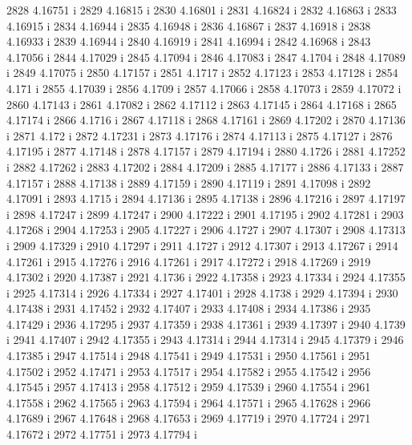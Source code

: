  2828  4.16751  i
 2829  4.16815  i
 2830  4.16801  i
 2831  4.16824  i
 2832  4.16863  i
 2833  4.16915  i
 2834  4.16944  i
 2835  4.16948  i
 2836  4.16867  i
 2837  4.16918  i
 2838  4.16933  i
 2839  4.16944  i
 2840  4.16919  i
 2841  4.16994  i
 2842  4.16968  i
 2843  4.17056  i
 2844  4.17029  i
 2845  4.17094  i
 2846  4.17083  i
 2847  4.1704  i
 2848  4.17089  i
 2849  4.17075  i
 2850  4.17157  i
 2851  4.1717  i
 2852  4.17123  i
 2853  4.17128  i
 2854  4.171  i
 2855  4.17039  i
 2856  4.1709  i
 2857  4.17066  i
 2858  4.17073  i
 2859  4.17072  i
 2860  4.17143  i
 2861  4.17082  i
 2862  4.17112  i
 2863  4.17145  i
 2864  4.17168  i
 2865  4.17174  i
 2866  4.1716  i
 2867  4.17118  i
 2868  4.17161  i
 2869  4.17202  i
 2870  4.17136  i
 2871  4.172  i
 2872  4.17231  i
 2873  4.17176  i
 2874  4.17113  i
 2875  4.17127  i
 2876  4.17195  i
 2877  4.17148  i
 2878  4.17157  i
 2879  4.17194  i
 2880  4.1726  i
 2881  4.17252  i
 2882  4.17262  i
 2883  4.17202  i
 2884  4.17209  i
 2885  4.17177  i
 2886  4.17133  i
 2887  4.17157  i
 2888  4.17138  i
 2889  4.17159  i
 2890  4.17119  i
 2891  4.17098  i
 2892  4.17091  i
 2893  4.1715  i
 2894  4.17136  i
 2895  4.17138  i
 2896  4.17216  i
 2897  4.17197  i
 2898  4.17247  i
 2899  4.17247  i
 2900  4.17222  i
 2901  4.17195  i
 2902  4.17281  i
 2903  4.17268  i
 2904  4.17253  i
 2905  4.17227  i
 2906  4.1727  i
 2907  4.17307  i
 2908  4.17313  i
 2909  4.17329  i
 2910  4.17297  i
 2911  4.1727  i
 2912  4.17307  i
 2913  4.17267  i
 2914  4.17261  i
 2915  4.17276  i
 2916  4.17261  i
 2917  4.17272  i
 2918  4.17269  i
 2919  4.17302  i
 2920  4.17387  i
 2921  4.1736  i
 2922  4.17358  i
 2923  4.17334  i
 2924  4.17355  i
 2925  4.17314  i
 2926  4.17334  i
 2927  4.17401  i
 2928  4.1738  i
 2929  4.17394  i
 2930  4.17438  i
 2931  4.17452  i
 2932  4.17407  i
 2933  4.17408  i
 2934  4.17386  i
 2935  4.17429  i
 2936  4.17295  i
 2937  4.17359  i
 2938  4.17361  i
 2939  4.17397  i
 2940  4.1739  i
 2941  4.17407  i
 2942  4.17355  i
 2943  4.17314  i
 2944  4.17314  i
 2945  4.17379  i
 2946  4.17385  i
 2947  4.17514  i
 2948  4.17541  i
 2949  4.17531  i
 2950  4.17561  i
 2951  4.17502  i
 2952  4.17471  i
 2953  4.17517  i
 2954  4.17582  i
 2955  4.17542  i
 2956  4.17545  i
 2957  4.17413  i
 2958  4.17512  i
 2959  4.17539  i
 2960  4.17554  i
 2961  4.17558  i
 2962  4.17565  i
 2963  4.17594  i
 2964  4.17571  i
 2965  4.17628  i
 2966  4.17689  i
 2967  4.17648  i
 2968  4.17653  i
 2969  4.17719  i
 2970  4.17724  i
 2971  4.17672  i
 2972  4.17751  i
 2973  4.17794  i
